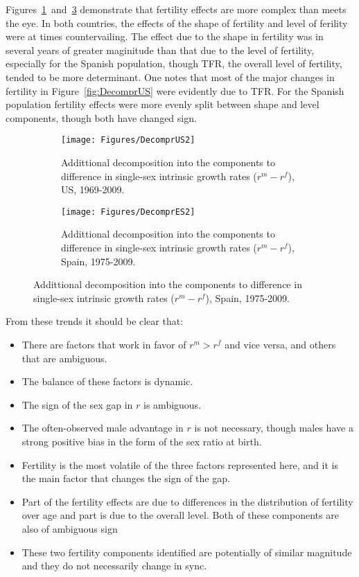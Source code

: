 Figures~\ref{fig:DecomprUS2}~and~\ref{fig:DecomprES2} demonstrate that fertility
effects are more complex than meets the eye. In both countries, the effects of
the shape of fertility and level of ferility were at times countervailing. The 
effect due to the shape in fertility was in several years of greater maginitude 
than that due to the level of fertility, especially for the Spanish
population, though TFR, the overall level of fertility, tended to be more
determinant. One notes that most of the major changes in fertility in
Figure~\ref{fig:DecomprUS} were evidently due to TFR. For the Spanish population
fertility effects were more evenly split between shape and level components,
though both have changed sign.

\begin{figure}[h!]
        \centering
        \begin{subfigure}
                \centering
                \caption{Addittional decomposition into the components to
                difference in single-sex intrinsic growth rates ($r^m - r^f$), US, 1969-2009.}
                \texttt{[image: Figures/DecomprUS2]}
                \label{fig:DecomprUS2}
        \end{subfigure}
        \begin{subfigure}
                \centering
                \caption{Addittional decomposition into the components to
                difference in single-sex intrinsic growth rates ($r^m - r^f$), Spain, 1975-2009.}
                \texttt{[image: Figures/DecomprES2]}  
                \label{fig:DecomprES2}
        \end{subfigure}
\end{figure}

\FloatBarrier
From these trends it should be clear that:
\begin{itemize}
  \item There are factors that work in favor of $r^m
> r^f$ and vice versa, and others that are ambiguous.
  \item The balance of these factors is dynamic.
  \item The sign of the sex gap in $r$ is ambiguous.
  \item The often-observed male advantage in $r$
is not necessary, though males have a strong positive bias in the form of the
sex ratio at birth.
  \item Fertility is the most volatile of the three factors represented here,
  and it is the main factor that changes the sign of the gap.
  \item Part of the fertility effects are due to differences in the distribution
  of fertility over age and part is due to the overall level. Both of these
  components are also of ambiguous sign
  \item These two fertility components identified are potentially of similar
  magnitude and they do not necessarily change in sync.
\end{itemize}

